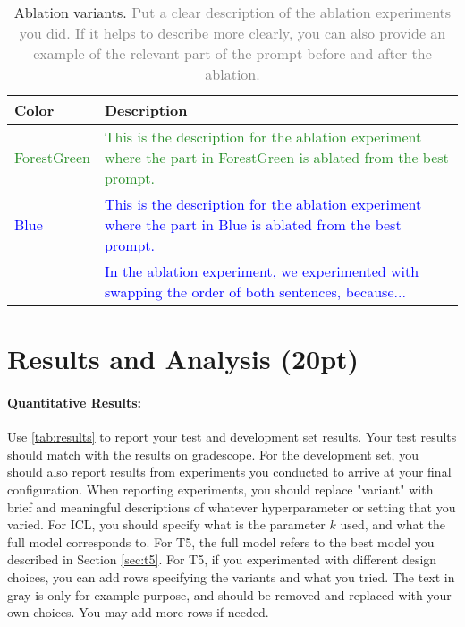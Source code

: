 \documentclass{article}
\begin{document}
\begin{table}[h!]
\centering
\begin{tabular}{p{2cm}p{10cm}}
\toprule
\textbf{Color} & \textbf{Description} \\
\midrule
\textcolor{ForestGreen}{ForestGreen} & \textcolor{ForestGreen}{This is the description for the ablation experiment where the part in ForestGreen is ablated from the best prompt.} \\
\textcolor{Blue}{Blue} & \textcolor{Blue}{This is the description for the ablation experiment where the part in Blue is ablated from the best prompt.} \\
& \textcolor{Blue}{In the ablation experiment, we experimented with swapping the order of both sentences, because...} \\
\bottomrule
\end{tabular}
\caption{Ablation variants.
{\textcolor{gray}{Put a clear description of the ablation experiments you did. If it helps to describe more clearly, you can also provide an example of the relevant part of the prompt before and after the ablation.}
}}
\label{tab:ablation_explanation}
\end{table}



\newpage



\section{Results and Analysis (20pt)}

\paragraph{Quantitative Results:} Use \autoref{tab:results} to report your test and development set results. 
Your test results should match with the results on gradescope. 
For the development set, you should also report results from experiments you conducted to arrive at your final configuration.
When reporting experiments, you should replace "variant" with brief and meaningful descriptions of whatever hyperparameter or setting that you varied. 
For ICL, you should specify what is the parameter $k$ used, and what the full model corresponds to. For T5, the full model refers to the best model you described in Section \ref{sec:t5}.
For T5, if you experimented with different design choices, you can add rows specifying the variants and what you tried.
The text in gray is only for example purpose, and should be removed and replaced with your own choices.
You may add more rows if needed.
\end{document}
